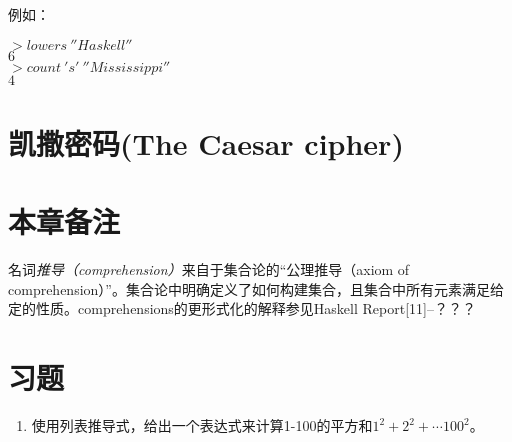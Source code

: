 例如：

\noindent\hspace*{1cm}$>lowers~''Haskell''$\\
\hspace*{1cm}$6$\\

\noindent\hspace*{1cm}$>count~'s'~''Mississippi''$\\
\hspace*{1cm}$4$\\

\section{凯撒密码(The Caesar cipher)}


\section{本章备注}
名词\textit{推导（comprehension）}来自于集合论的“公理推导（axiom of comprehension）”。集合论中明确定义了如何构建集合，且集合中所有元素满足给定的性质。comprehensions的更形式化的解释参见Haskell Report[11]--？？？

\section{习题}

\begin{enumerate}
  \item 使用列表推导式，给出一个表达式来计算1-100的平方和$1^2 + 2^2 +\cdots 100^2$。
\end{enumerate}






